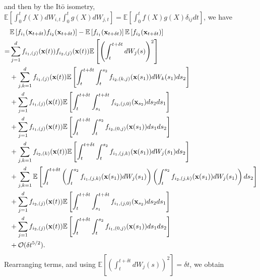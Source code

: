 %
and then by the It\={o} isometry, $\mathbb{E} \left[ \int_0^t f(X) dW_{i,t} \int_0^t g(X) dW_{j,t} \right] = \mathbb{E} \left[ \int_0^t f(X) g(X) \delta_{ij} dt \right]$, we have
\begin{equation}
\begin{aligned}
&\mathbb{E} \left[ f_{i_1}(\mathbf{x}_{t + \delta t}) f_{i_2}(\mathbf{x}_{t + \delta t}) \right]
- \mathbb{E} \left[ f_{i_1}(\mathbf{x}_{t + \delta t}) \right] \mathbb{E} \left[ f_{i_2}(\mathbf{x}_{t + \delta t}) \right] \\
=&
 \sum_{j=1}^d f_{{i_1},(j)}(\mathbf{x}(t)) f_{{i_2},(j)}(\mathbf{x}(t)) \mathbb{E} \left[ \left( \int_t^{t + \delta t} dW_j(s) \right)^2 \right] \\
&+ \sum_{j,k=1}^d f_{{i_1},(j)}(\mathbf{x}(t)) \mathbb{E} \left[  \int_t^{t+\delta t} \int_t^{s_2} f_{{i_2},(k,j)}(\mathbf{x}(s_1)) dW_k(s_1) ds_2 \right] \\
&+ \sum_{j=1}^d f_{{i_1},(j)}(\mathbf{x}(t)) \mathbb{E} \left[ \int_t^{t+\delta t} \int_{s_1}^{t+\delta t} f_{{i_2},(j,0)}(\mathbf{x}_{s_2}) ds_2 ds_1 \right]\\
&+ \sum_{j=1}^d f_{{i_1},(j)}(\mathbf{x}(t)) \mathbb{E} \left[  \int_t^{t+\delta t} \int_t^{s_2} f_{{i_2},(0,j)}(\mathbf{x}(s_1)) ds_1 ds_2\right] \\
&+  \sum_{j, k=1}^d  f_{{i_2},(k)}(\mathbf{x}(t))\mathbb{E} \left[ \int_t^{t+\delta t} \int_t^{s_2} f_{{i_1},(j,k)}(\mathbf{x}(s_1)) dW_j(s_1) ds_2 \right] \\
&+ \sum_{j, k=1}^d \mathbb{E} \left[ \int_t^{t+\delta t}\left( \int_t^{s_2} f_{{i_1},(j,k)}(\mathbf{x}(s_1)) dW_j(s_1)  \right) \left(  \int_t^{s_2} f_{{i_2},(j,k)}(\mathbf{x}(s_1)) dW_j(s_1) \right) ds_2 \right] \\
&+  \sum_{j=1}^d f_{{i_2},(j)}(\mathbf{x}(t)) \mathbb{E} \left[ \int_t^{t+\delta t} \int_{s_1}^{t + \delta t} f_{{i_1},(j,0)}(\mathbf{x}_{s_2}) ds_2 ds_1 \right]\\
&+   \sum_{j=1}^d  f_{{i_2},(j)}(\mathbf{x}(t)) \mathbb{E} \left[ \int_t^{t+\delta t} \int_t^{s_2} f_{{i_1},(0,j)}(\mathbf{x}(s_1)) ds_1 ds_2 \right] \\
&+ \mathcal{O} (\delta t^{5/2}) .
\end{aligned}
\end{equation}
%
Rearranging terms, and using $\mathbb{E} \left[ \left( \int_t^{t + \delta t} dW_j(s) \right)^2 \right] = \delta t$, we obtain
